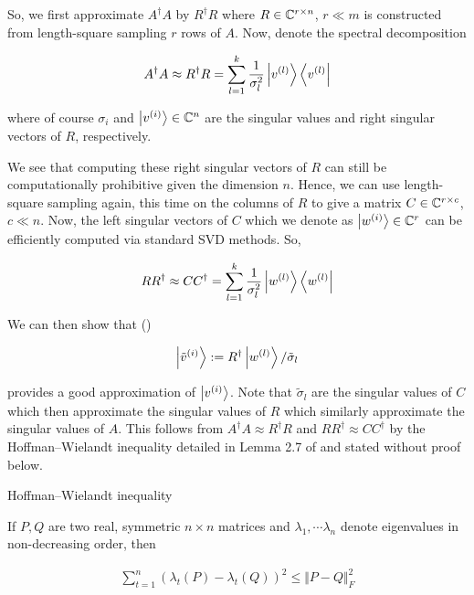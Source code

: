 \documentclass[main.tex]{subfiles}
\begin{document}
So, we first approximate $A^\dag A$ by $R^\dag R$ where $R \in \mathbb{C}^{r \times n}$, $r \ll m$ is constructed from length-square sampling $r$ rows of $A$. Now, denote the spectral decomposition 

\begin{align*}
A^\dag A \approx R^\dag R = \sum_{l=1}^k \frac{1}{\sigma_l^2}\ket{v^{(l)}}\bra{v^{(l)}}
\end{align*}

where of course $\sigma_i$ and $\ket{v^{(i)}} \in \mathbb{C}^n$ are the singular values and right singular vectors of $R$, respectively.

We see that computing these right singular vectors of $R$ can still be computationally prohibitive given the dimension $n$. Hence, we can use length-square sampling again, this time on the columns of $R$ to give a matrix $C \in \mathbb{C}^{r \times c}$, $c \ll n$. Now, the left singular vectors of $C$ which we denote as $\ket{w^{(i)}} \in \mathbb{C}^r$ can be efficiently computed via standard SVD methods. So,

\begin{align*}
RR^\dag \approx CC^\dag = \sum_{l=1}^k \frac{1}{\sigma_l^2}\ket{w^{(l)}}\bra{w^{(l)}}
\end{align*}


We can then show that ()

\begin{align}
\label{def:approx-right}
\ket{\tilde{v}^{(i)}} := R^\dag \ket{w^{(l)}} / \tilde{\sigma}_l
\end{align}

provides a good approximation of $\ket{v^{(i)}}$. Note that $\tilde{\sigma}_l$ are the singular values of $C$ which then approximate the singular values of $R$ which similarly approximate the singular values of $A$. This follows from $A^\dag A \approx R^\dag R$ and $RR^\dag \approx CC^\dag$ by the Hoffman--Wielandt inequality detailed in Lemma 2.7 of \cite{kannan2017randomized} and stated without proof below.

\begin{lemma}Hoffman--Wielandt inequality

	If $P, Q$ are two real, symmetric $n \times n$ matrices and $\lambda_1, \cdots \lambda_n$ denote eigenvalues in non-decreasing order, then
	
	\begin{align*}
		\sum_{t=1}^n(\lambda_t(P) - \lambda_t(Q))^2 \leq \Vert P - Q \Vert_F^2
	\end{align*}
\end{lemma}
\end{document}
